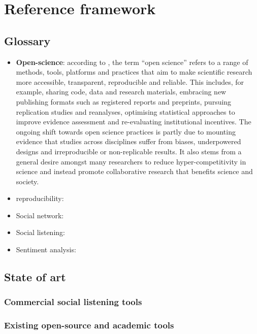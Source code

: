 \section{Reference framework}

\subsection{Glossary}

\begin{itemize}
	\item \textbf{Open-science}: according to \textcite{bertram2023open}, the term \enquote{open science} refers to a range of methods, tools, platforms and practices that aim to make scientific research more accessible, transparent, reproducible and reliable. This includes, for example, sharing code, data and research materials, embracing new publishing formats such as registered reports and preprints, pursuing replication studies and reanalyses, optimising statistical approaches to improve evidence assessment and re-evaluating institutional incentives. The ongoing shift towards open science practices is partly due to mounting evidence that studies across disciplines suffer from biases, underpowered designs and irreproducible or non-replicable results. It also stems from a general desire amongst many researchers to reduce hyper-competitivity in science and instead promote collaborative research that benefits science and society.

	\item reproducibility:

	\item Social network:

	\item Social listening:

	\item Sentiment analysis:

\end{itemize}

\subsection{State of art}

\subsubsection{Commercial social listening tools}

\subsubsection{Existing open-source and academic tools}

